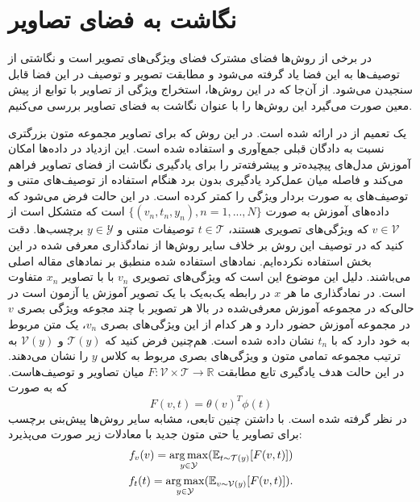\section{نگاشت به فضای تصاویر}\label{to_images}
در برخی از روش‌ها فضای مشترک فضای ویژگی‌های تصویر است و نگاشتی از توصیف‌ها به این فضا یاد گرفته می‌شود و مطابقت تصویر و توصیف در این فضا قابل سنجیدن می‌شود. از آن‌جا که در این روش‌‌ها، استخراج ویژگی از تصاویر با توابع از پیش معین صورت می‌گیرد این روش‌ها را با عنوان نگاشت به فضای تصاویر بررسی می‌کنیم.


 یک تعمیم  از  در \cite{Reed2016} ارائه شده است. در این روش که برای تصاویر مجموعه متون بزرگتری نسبت به دادگان قبلی جمع‌آوری و استفاده شده است.
  این ازدیاد در داده‌ها امکان آموزش مدل‌های پیچیده‌تر و پیشرفته‌تر را برای یادگیری نگاشت از فضای تصاویر فراهم می‌کند و فاصله میان عمل‌کرد یادگیری بدون برد هنگام استفاده از
  توصیف‌های متنی و توصیف‌های به صورت بردار ویژگی را کمتر کرده است.
  در این حالت فرض می‌شود که داده‌های آموزش به صورت
   $\{(v_{n},t_{n},y_{n}), n = 1, ..., N\}$
   است که متشکل است از
    $v \in \mathcal{V}$
    که ویژگی‌های تصویری هستند،
     $t \in \mathcal{T}$ توصیفات متنی و $y \in \mathcal{Y}$ برچسب‌ها.
      دقت کنید که در توصیف این روش بر خلاف سایر روش‌ها از نمادگذاری معرفی شده در این بخش استفاده نکرده‌ایم.
      نمادهای استفاده شده منطبق بر نمادهای مقاله اصلی می‌باشند. دلیل این موضوع این است که ویژگی‌های تصویری $v_n$ با با تصاویر  $x_n$ متفاوت است. در نمادگذاری ما هر $x$ در رابطه یک‌به‌یک با یک تصویر آموزش یا آزمون است در حالی‌که در مجموعه آموزش معرفی‌شده در بالا هر تصویر با چند مجوعه ویژگی بصری $v$ در مجموعه آموزش حضور دارد و هر کدام از این ويژگی‌های بصری $v_n$، یک متن مربوط به خود دارد که با $t_n$ نشان داده ‌شده است. هم‌چنین فرض کنید که  $\mathcal{T}(y)$ و $\mathcal{V}(y)$ به ترتیب مجموعه تمامی متون و ویژگی‌های بصری مربوط به کلاس $y$ را نشان می‌دهند.
  در این حالت هدف یادگیری تابع مطابقت $F : \mathcal{V} \times \mathcal{T} \rightarrow \mathbb{R}$ میان تصاویر و توصیف‌هاست. که به صورت
  \begin{equation}
  \label{eq:akata16comp}
F(v, t) = \theta(v)^T\phi(t)
  \end{equation}
در نظر گرفته شده است. با داشتن چنین تابعی، مشابه سایر روش‌ها پیش‌بنی برچسب برای تصاویر یا حتی متون جدید با معادلات زیر صورت می‌پذیرد:
\begin{align}
\label{eq:akata16class}
f_v(v) = \underset{y \in \mathcal{Y}}{\operatorname*{arg\,max}} ( \mathbb{ E}_{t \sim \mathcal{T}(y)}[F(v, t)])\\
f_t(t) = \underset{y \in \mathcal{Y}}{\operatorname*{arg\,max}} (\mathbb{ E}_{v \sim \mathcal{V}(y)}[F(v, t)]).
\end{align}
